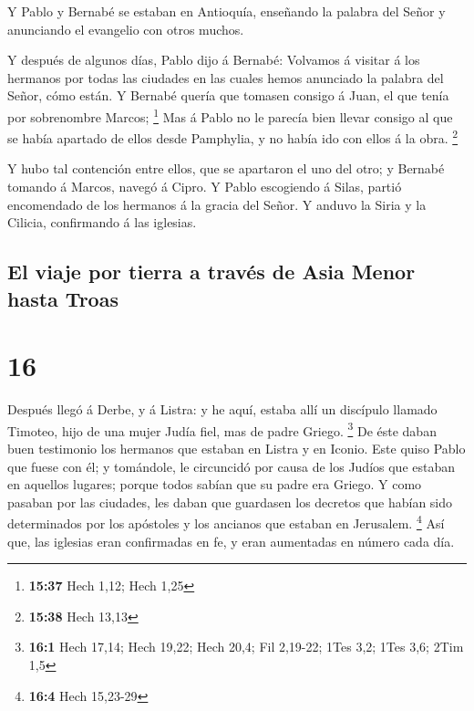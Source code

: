  Y Pablo y Bernabé se estaban en Antioquía, enseñando la
palabra del Señor y anunciando el evangelio con otros muchos.

 Y después de algunos días, Pablo dijo á Bernabé: Volvamos
á visitar á los hermanos por todas las ciudades en las cuales hemos
anunciado la palabra del Señor, cómo están.  Y Bernabé
quería que tomasen consigo á Juan, el que tenía por sobrenombre Marcos;
\footnote{\textbf{15:37} Hech 1,12; Hech 1,25}  Mas á Pablo
no le parecía bien llevar consigo al que se había apartado de ellos
desde Pamphylia, y no había ido con ellos á la obra. \footnote{\textbf{15:38}
  Hech 13,13}

 Y hubo tal contención entre ellos, que se apartaron el uno
del otro; y Bernabé tomando á Marcos, navegó á Cipro.  Y
Pablo escogiendo á Silas, partió encomendado de los hermanos á la gracia
del Señor.  Y anduvo la Siria y la Cilicia, confirmando á
las iglesias.

\hypertarget{el-viaje-por-tierra-a-travuxe9s-de-asia-menor-hasta-troas}{%
\subsection{El viaje por tierra a través de Asia Menor hasta
Troas}\label{el-viaje-por-tierra-a-travuxe9s-de-asia-menor-hasta-troas}}

\hypertarget{section-15}{%
\section{16}\label{section-15}}

 Después llegó á Derbe, y á Listra: y he aquí, estaba allí
un discípulo llamado Timoteo, hijo de una mujer Judía fiel, mas de padre
Griego. \footnote{\textbf{16:1} Hech 17,14; Hech 19,22; Hech 20,4; Fil
  2,19-22; 1Tes 3,2; 1Tes 3,6; 2Tim 1,5}  De éste daban buen
testimonio los hermanos que estaban en Listra y en Iconio. 
Este quiso Pablo que fuese con él; y tomándole, le circuncidó por causa
de los Judíos que estaban en aquellos lugares; porque todos sabían que
su padre era Griego.  Y como pasaban por las ciudades, les
daban que guardasen los decretos que habían sido determinados por los
apóstoles y los ancianos que estaban en Jerusalem. \footnote{\textbf{16:4}
  Hech 15,23-29}  Así que, las iglesias eran confirmadas en
fe, y eran aumentadas en número cada día.

